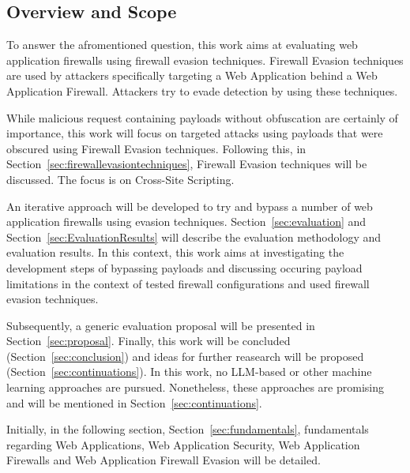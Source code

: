 \subsection{Overview and Scope}
To answer the afromentioned question, this work aims at evaluating web application firewalls using firewall evasion techniques. Firewall Evasion techniques are used by attackers specifically targeting a Web Application behind a Web Application Firewall. Attackers try to evade detection by using these techniques. 

While malicious request containing payloads without obfuscation are certainly of importance, this work will focus on targeted attacks using payloads that were obscured using Firewall Evasion techniques.
Following this, in Section~\ref{sec:firewallevasiontechniques}, Firewall Evasion techniques will be discussed. The focus is on Cross-Site Scripting. 

An iterative approach will be developed to try and bypass a number of web application firewalls using evasion techniques. Section~\ref{sec:evaluation} and Section~\ref{sec:EvaluationResults} will describe the evaluation methodology and evaluation results. In this context, this work aims at investigating the development steps of bypassing payloads and discussing occuring payload limitations in the context of tested firewall configurations and used firewall evasion techniques.

Subsequently, a generic evaluation proposal will be presented in Section~\ref{sec:proposal}. Finally, this work will be concluded (Section~\ref{sec:conclusion}) and ideas for further reasearch will be proposed (Section~\ref{sec:continuations}). In this work, no LLM-based or other machine learning approaches are pursued. Nonetheless, these approaches are promising and will be mentioned in Section~\ref{sec:continuations}.

Initially, in the following section, Section~\ref{sec:fundamentals}, fundamentals regarding Web Applications, Web Application Security, Web Application Firewalls and Web Application Firewall Evasion will be detailed.
